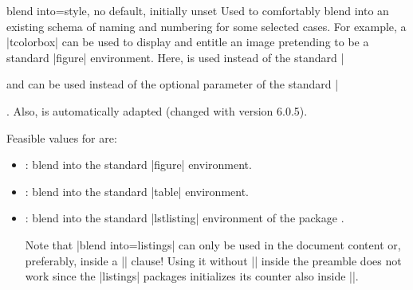 \begin{newTcbKey}[][doc new and updated={2014-09-19}{2023-07-03}]{blend into}{=}{style, no default, initially unset}
Used to comfortably blend into an existing schema of naming and numbering for
some selected cases. For example, a |tcolorbox| can be used to display
and entitle an image pretending to be a standard |figure| environment.
Here,  is used instead of the standard |\caption|
and  can be used instead of the optional parameter
of the standard |\caption|.
Also,  is automatically adapted (changed with version 6.0.5).

Feasible values for  are:
\begin{itemize}
\item{}: blend into the standard |figure| environment.
\item{}: blend into the standard |table| environment.
\item{}: blend into the standard |lstlisting| environment
  of the package  \cite{hoffmann:listings}.
  \begin{marker}
  Note that |blend into=listings| can only be used in the document content
  or, preferably, inside a |\AtBeginDocument| clause! Using it without
  |\AtBeginDocument| inside the preamble does not work since the |listings|
  packages initializes its counter also inside |\AtBeginDocument|.
  \end{marker}
\end{itemize}
\end{newTcbKey}

\enlargethispage*{5cm}
{\tcbusetemp}



